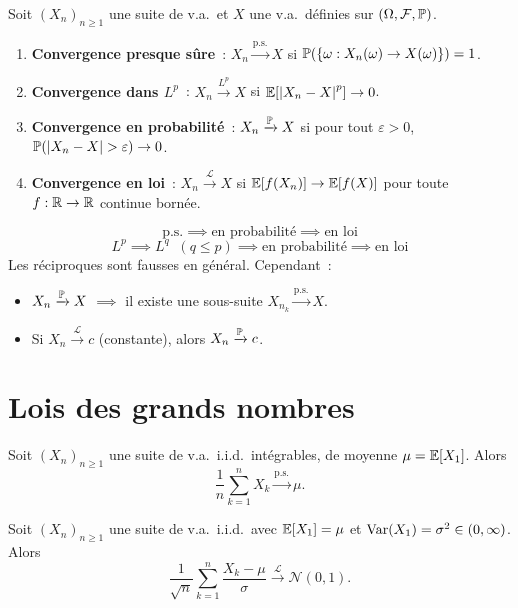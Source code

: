 \begin{definition}[Convergences]
Soit $(X_n)_{n \geq 1}$ une suite de v.a.\ et $X$ une v.a.\ d\'efinies sur
$(\Omega, \mathcal{F}, \mathbb{P})$.
\begin{enumerate}
  \item \textbf{Convergence presque s\^ure}~: $X_n \xrightarrow{\text{p.s.}} X$
    si $\mathbb{P}(\{\omega : X_n(\omega) \to X(\omega)\}) = 1$.
  \item \textbf{Convergence dans $L^p$}~: $X_n \xrightarrow{L^p} X$ si
    $\mathbb{E}[\left| X_n - X \right|^p] \to 0$.
  \item \textbf{Convergence en probabilit\'e}~: $X_n \xrightarrow{\mathbb{P}} X$ si
    pour tout $\varepsilon > 0$, $\mathbb{P}(\left| X_n - X \right| > \varepsilon) \to 0$.
  \item \textbf{Convergence en loi}~: $X_n \xrightarrow{\mathcal{L}} X$ si
    $\mathbb{E}[f(X_n)] \to \mathbb{E}[f(X)]$ pour toute $f : \mathbb{R} \to \mathbb{R}$ continue born\'ee.
\end{enumerate}
\end{definition}

\begin{formules}[title=\textbf{Hi\'erarchie des convergences}]
\[
  \text{p.s.} \implies \text{en probabilit\'e} \implies \text{en loi}
\]
\[
  L^p \implies L^q \;\;(q \leq p) \implies \text{en probabilit\'e} \implies \text{en loi}
\]
Les r\'eciproques sont fausses en g\'en\'eral. Cependant~:
\begin{itemize}
  \item $X_n \xrightarrow{\mathbb{P}} X$ $\implies$ il existe une sous-suite $X_{n_k} \xrightarrow{\text{p.s.}} X$.
  \item Si $X_n \xrightarrow{\mathcal{L}} c$ (constante), alors $X_n \xrightarrow{\mathbb{P}} c$.
\end{itemize}
\end{formules}

\section{Lois des grands nombres}

\begin{theoreme}
\label{thm:lfgn}
Soit $(X_n)_{n \geq 1}$ une suite de v.a.\ i.i.d.\ int\'egrables, de moyenne
$\mu = \mathbb{E}[X_1]$. Alors
\[
  \frac{1}{n} \sum_{k=1}^{n} X_k \xrightarrow{\text{p.s.}} \mu.
\]
\end{theoreme}

\begin{theoreme}
\label{thm:tcl}
Soit $(X_n)_{n \geq 1}$ une suite de v.a.\ i.i.d.\ avec $\mathbb{E}[X_1] = \mu$ et
$\mathrm{Var}(X_1) = \sigma^2 \in (0, \infty)$. Alors
\[
  \frac{1}{\sqrt{n}} \sum_{k=1}^{n} \frac{X_k - \mu}{\sigma}
  \xrightarrow{\mathcal{L}} \mathcal{N}(0, 1).
\]
\end{theoreme}

